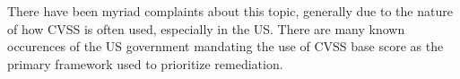 \documentclass[12pt]{article}
\begin{document}
There have been myriad complaints about this topic, generally due to the nature of how CVSS is often
used, especially in the US. There are many known occurences of the US government mandating the use
of CVSS base score as the primary framework used to prioritize remediation.








\end{document}
